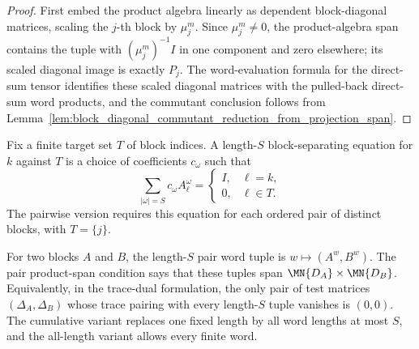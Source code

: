 \begin{proof}
    \notready
    First embed the product algebra linearly as dependent block-diagonal matrices, scaling the
    $j$-th block by $\mu_j^m$. Since $\mu_j^m\neq0$, the product-algebra span contains the
    tuple with $(\mu_j^m)^{-1}I$ in one component and zero elsewhere; its scaled diagonal image is
    exactly $P_j$. The word-evaluation formula for the direct-sum tensor identifies these scaled
    diagonal matrices with the pulled-back direct-sum word products, and the commutant conclusion
    follows from Lemma~\ref{lem:block_diagonal_commutant_reduction_from_projection_span}.
\end{proof}

\begin{definition}
    \label{def:pairwise_block_separating_words}
    \leanok
    Fix a finite target set $T$ of block indices. A length-$S$ block-separating
    equation for $k$ against $T$ is a choice of coefficients $c_\omega$ such that
    \[
        \sum_{|\omega|=S} c_\omega A_\ell^\omega
        =
        \begin{cases}
            I, & \ell=k,\\
            0, & \ell\in T.
        \end{cases}
    \]
    The pairwise version requires this equation for each ordered pair of
    distinct blocks, with $T=\{j\}$.
\end{definition}

\begin{definition}
    \label{def:pair_trace_separation_words}
    \leanok
    For two blocks $A$ and $B$, the length-$S$ pair word tuple is
    $w \mapsto (A^w,B^w)$. The pair product-span condition says that these
    tuples span $\MN{D_A}\times\MN{D_B}$. Equivalently, in the trace-dual
    formulation, the only pair of test matrices $(\Delta_A,\Delta_B)$ whose
    trace pairing with every length-$S$ tuple vanishes is $(0,0)$. The
    cumulative variant replaces one fixed length by all word lengths at most
    $S$, and the all-length variant allows every finite word.
\end{definition}


